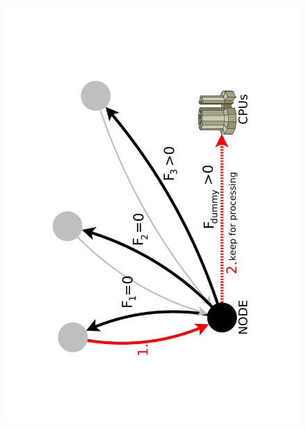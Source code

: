 \documentclass{beamer}
\begin{document}
\begin{frame}
\begin{columns}[c]
\begin{figure}[h]
		\includegraphics [trim= 30mm 30mm 30mm 30mm , clip, angle =-90, width=\textwidth]{pic/handler_process.pdf}
	\label{real_network}
\end{figure} 


\end{columns}
\end{frame}
\end{document}
